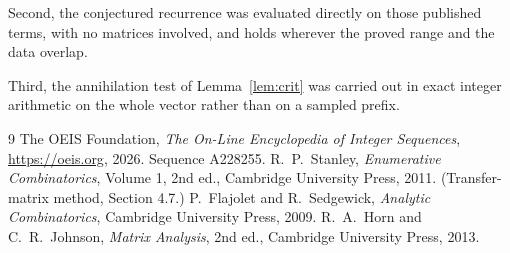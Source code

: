 \documentclass[11pt,a4paper]{article}
\theoremstyle{plain}
\theoremstyle{definition}
\begin{document}
Second, the conjectured recurrence was evaluated directly on those published terms, with no
matrices involved, and holds wherever the proved range and the data overlap.

Third, the annihilation test of Lemma~\ref{lem:crit} was carried out in exact integer
arithmetic on the whole vector rather than on a sampled prefix.

\begin{thebibliography}{9}
 The OEIS Foundation, \emph{The On-Line Encyclopedia of Integer
Sequences}, \url{https://oeis.org}, 2026. Sequence A228255.
 R.~P.~Stanley, \emph{Enumerative Combinatorics}, Volume 1, 2nd ed.,
Cambridge University Press, 2011. (Transfer-matrix method, Section 4.7.)
 P.~Flajolet and R.~Sedgewick, \emph{Analytic Combinatorics}, Cambridge
University Press, 2009.
 R.~A.~Horn and C.~R.~Johnson, \emph{Matrix Analysis}, 2nd ed., Cambridge
University Press, 2013.
\end{thebibliography}
\end{document}
